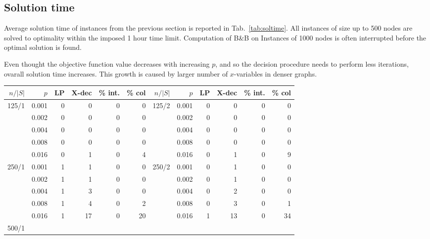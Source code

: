 \subsection{Solution time}

Average solution time of instances from the previous section is reported in Tab.~\ref{tab:soltime}.
All instances of size up to 500 nodes are solved to optimality within the imposed 1 hour time limit.
Computation of B\&B on Instances of 1000 nodes is often interrupted before the optimal solution is found.


Even thought the objective function value decreases with increasing $p$, and so the decision procedure needs to perform less iterations, ovarall solution time increases.
This growth is caused by larger number of $x$-variables in denser graphs.

\begin{table}[]
\centering
\begin{tabular}{rrrrrr|rrrrrr}
$n/|S|$ & $p$ & LP  & X-dec & \% int. & \% col & $n/|S|$ & $p$ & LP  & X-dec & \% int. & \% col \\
\hline
\multirow{5}{*}{125/1} 
 & 0.001 & 0   &  0 & 0 & 0 &\multirow{5}{*}{125/2} & 0.001 &  0  &  0 &  0  &  0\\
 & 0.002 & 0   &  0 & 0 & 0 &    	  	    & 0.002 &  0  &  0 &  0  &  0\\
 & 0.004 & 0   &  0 & 0 & 0 &    	  	    & 0.004 &  0  &  0 &  0  &  0\\
 & 0.008 & 0   &  0 & 0 & 0 &    	  	    & 0.008 &  0  &  0 &  0  &  0\\
 & 0.016 & 0   &  1 & 0 & 4 &    	  	    & 0.016 &  0  &  1 &  0  &  9\\
\hline                                                                           
\multirow{5}{*}{250/1}                                                           
 & 0.001 &  1  &  1 & 0 & 0 &\multirow{5}{*}{250/2} & 0.001 &  0  &  1 & 0   & 0 \\
 & 0.002 &  1  &  1 & 0 & 0 & 	      		    & 0.002 &  0  &  1 & 0   & 0 \\
 & 0.004 &  1  &  3 & 0 & 0 & 	      		    & 0.004 &  0  &  2 & 0   & 0 \\
 & 0.008 &  1  &  4 & 0 & 2 & 	      		    & 0.008 &  0  &  3 & 0   & 1 \\
 & 0.016 &  1  & 17 & 0 &20 & 	      		    & 0.016 &  1  & 13 & 0   &34 \\
\hline                                                                           
\multirow{5}{*}{500/1}                                                           

\end{tabular}
\end{table}
